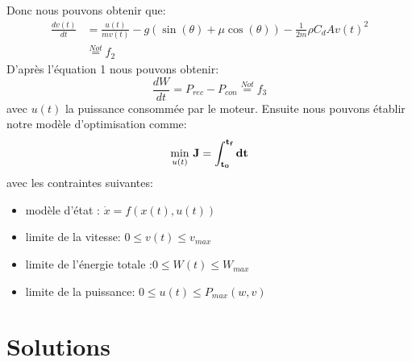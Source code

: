 \documentclass[lettersize,journal]{IEEEtran}
\begin{document}
Donc nous pouvons obtenir que:
\begin{equation}
\begin{aligned}
    \frac{dv(t)}{dt} &= \frac{u(t)}{mv(t)} - g(\sin (\theta)+ \mu \cos (\theta))-\frac{1}{2m}\rho C_{d}A v(t)^{2}\\
    &\overset{Not}{=} f_2
\end{aligned}
\end{equation}
D'après l'équation 1 nous pouvons obtenir:
\begin{equation}
    \frac{dW}{dt} = P_{rec} - P_{con} \overset{Not}{=} f_3
\end{equation}
avec $u(t)$ la puissance consommée par le moteur.
Ensuite nous pouvons établir notre modèle d'optimisation comme:
\begin{equation}
    \underset{u(t)}{\min}\ \bf{J} = \int_{t_0}^{t_f} dt
\end{equation}
avec les contraintes suivantes:
\begin{itemize}
    \item modèle d'état : $\dot{x} = f(x(t), u(t))$
    \item limite de la vitesse: $0 \leq v(t) \leq v_{max}$
    \item limite de l'énergie totale :$0 \leq W(t) \leq W_{max}$
    \item limite de la puissance: $0 \leq u(t) \leq P_{max}(w,v)$
\end{itemize}

\section{Solutions}
\end{document}
